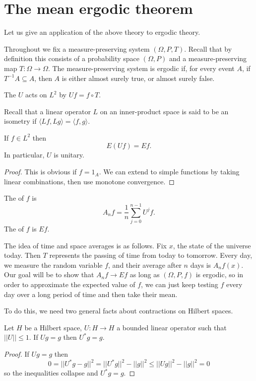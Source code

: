 \section{The mean ergodic theorem}
Let us give an application of the above theory to ergodic theory.

Throughout we fix a measure-preserving system $(\Omega, P, T)$.
Recall that by definition this consists of a probability space $(\Omega, P)$ and a measure-preserving map $T: \Omega \to \Omega$.
The measure-preserving system is ergodic if, for every event $A$, if $T^{-1}A \subseteq A$, then $A$ is either almost surely true, or almost surely false.

\begin{definition}
The  $U$ acts on $L^2$ by $Uf = f \circ T$.
\end{definition}

Recall that a linear operator $L$ on an inner-product space is said to be an isometry if $\langle Lf, Lg\rangle = \langle f, g\rangle$.

\begin{lemma}
If $f \in L^2$ then
\[E(Uf) = Ef.\]
In particular, $U$ is unitary.
\end{lemma}
\begin{proof}
This is obvious if $f = 1_A$.
We can extend to simple functions by taking linear combinations, then use monotone convergence.
\end{proof}

\begin{definition}
The  of $f$ is
\[A_{n}f = \frac{1}{n} \sum_{j=0}^{n-1} U^jf.\]
The  of $f$ is $Ef$.
\end{definition}

The idea of time and space averages is as follows. Fix $x$, the state of the universe today. Then $T$ represents the passing of time from today to tomorrow.
Every day, we measure the random variable $f$, and their average after $n$ days is $A_{n}f(x)$.
Our goal will be to show that $A_{n}f \to Ef$ as long as $(\Omega, P, f)$ is ergodic, so in order to approximate the expected value of $f$, we can just keep testing $f$ every day over a long period of time and then take their mean.

To do this, we need two general facts about contractions on Hilbert spaces.
\begin{lemma}
Let $H$ be a Hilbert space, $U: H \to H$ a bounded linear operator such that $||U|| \leq 1$.
If $Ug = g$ then $U^*g = g$.
\end{lemma}
\begin{proof}
If $Ug = g$ then
\[0 = ||U^*g - g||^2 = ||U^*g||^2 - ||g||^2 \leq ||Ug||^2 - ||g||^2 = 0\]
so the inequalities collapse and $U^*g = g$.
\end{proof}

